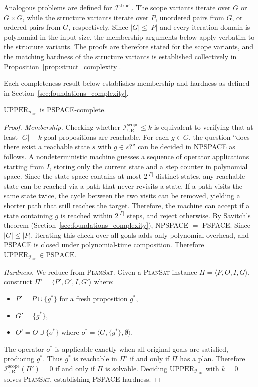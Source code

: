 Analogous problems are defined for $\mathcal{I}^{\text{struct}}$. The scope variants iterate over $G$ or $G \times G$, while the structure variants iterate over $P$, unordered pairs from $G$, or ordered pairs from $G$, respectively. Since $|G| \leq |P|$ and every iteration domain is polynomial in the input size, the membership arguments below apply verbatim to the structure variants. The proofs are therefore stated for the scope variants, and the matching hardness of the structure variants is established collectively in Proposition~\ref{prop:struct_complexity}.

Each completeness result below establishes membership and hardness as defined in Section~\ref{sec:foundations_complexity}.

\begin{thm}
    \label{thm:ur_complexity}
    $\text{UPPER}_{\mathcal{I}_{\text{UR}}}$ is PSPACE-complete.
\end{thm}
\begin{proof}
    \emph{Membership.} Checking whether $\mathcal{I}^{\text{scope}}_{\text{UR}} \leq k$ is equivalent to verifying that at least $|G| - k$ goal propositions are reachable. For each $g \in G$, the question ``does there exist a reachable state $s$ with $g \in s$?'' can be decided in NPSPACE as follows. A nondeterministic machine guesses a sequence of operator applications starting from $I$, storing only the current state and a step counter in polynomial space. Since the state space contains at most $2^{|P|}$ distinct states, any reachable state can be reached via a path that never revisits a state. If a path visits the same state twice, the cycle between the two visits can be removed, yielding a shorter path that still reaches the target. Therefore, the machine can accept if a state containing $g$ is reached within $2^{|P|}$ steps, and reject otherwise. By Savitch's theorem (Section~\ref{sec:foundations_complexity}), NPSPACE $=$ PSPACE. Since $|G| \leq |P|$, iterating this check over all goals adds only polynomial overhead, and PSPACE is closed under polynomial-time composition. Therefore $\text{UPPER}_{\mathcal{I}_{\text{UR}}} \in \text{PSPACE}$.

    \emph{Hardness.} We reduce from \textsc{PlanSat}. Given a \textsc{PlanSat} instance $\Pi = \langle P, O, I, G \rangle$, construct $\Pi' = \langle P', O', I, G' \rangle$ where:
    \begin{itemize}
        \item $P' = P \cup \{g^*\}$ for a fresh proposition $g^*$,
        \item $G' = \{g^*\}$,
        \item $O' = O \cup \{o^*\}$ where $o^* = \langle G, \{g^*\}, \emptyset \rangle$.
    \end{itemize}
    The operator $o^*$ is applicable exactly when all original goals are satisfied, producing $g^*$. Thus $g^*$ is reachable in $\Pi'$ if and only if $\Pi$ has a plan. Therefore $\mathcal{I}^{\text{scope}}_{\text{UR}}(\Pi') = 0$ if and only if $\Pi$ is solvable. Deciding $\text{UPPER}_{\mathcal{I}_{\text{UR}}}$ with $k = 0$ solves \textsc{PlanSat}, establishing PSPACE-hardness.
\end{proof}


